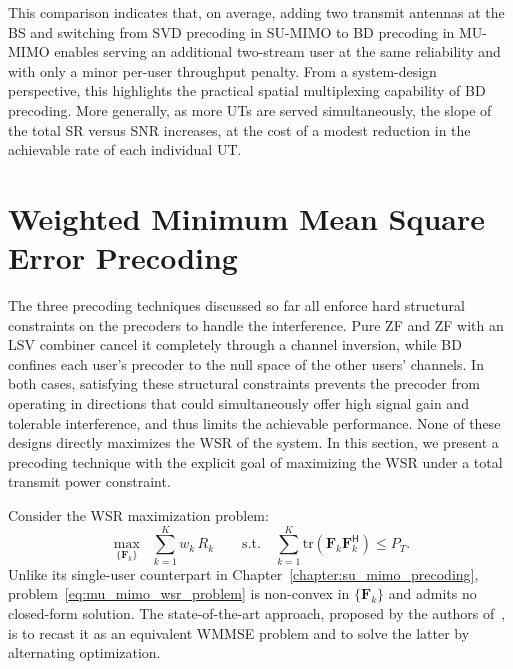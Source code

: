 This comparison indicates that, on average, adding two transmit antennas at the \ac{BS} and switching from \ac{SVD} precoding in \ac{SU}-\ac{MIMO} to \ac{BD} precoding in \ac{MU}-\ac{MIMO} enables serving an additional two-stream user at the same reliability and with only a minor per-user throughput penalty.
From a system-design perspective, this highlights the practical spatial multiplexing capability of \ac{BD} precoding.
More generally, as more \acp{UT} are served simultaneously, the slope of the total \ac{SR} versus \ac{SNR} increases, at the cost of a modest reduction in the achievable rate of each individual \ac{UT}.


\section{Weighted Minimum Mean Square Error Precoding}
\label{section:mu_mimo_wmmse_precoding}

The three precoding techniques discussed so far all enforce hard structural constraints on the precoders to handle the interference. Pure \ac{ZF} and \ac{ZF} with an \ac{LSV} combiner cancel it completely through a channel inversion, while \ac{BD} confines each user's precoder to the null space of the other users' channels.
In both cases, satisfying these structural constraints prevents the precoder from operating in directions that could simultaneously offer high signal gain and tolerable interference, and thus limits the achievable performance.
None of these designs directly maximizes the \acf{WSR} of the system.
In this section, we present a precoding technique with the explicit goal of maximizing the \ac{WSR} under a total transmit power constraint.

Consider the \ac{WSR} maximization problem:
\begin{equation}
\label{eq:mu_mimo_wsr_problem}
    \underset{\{\mathbf{F}_k\}}{\max} \;\; \sum_{k=1}^{K} w_k \, R_k \qquad \text{s.t.} \quad \sum_{k=1}^{K} \mathrm{tr}\!\left(\mathbf{F}_k \mathbf{F}_k^{\mathsf{H}}\right) \leq P_T.
\end{equation}
Unlike its single-user counterpart in Chapter~\ref{chapter:su_mimo_precoding}, problem~\eqref{eq:mu_mimo_wsr_problem} is non-convex in $\{\mathbf{F}_k\}$ and admits no closed-form solution.
The state-of-the-art approach, proposed by the authors of~\cite{WMMSE_precoding}, is to recast it as an equivalent \ac{WMMSE} problem and to solve the latter by alternating optimization.
\medskip

